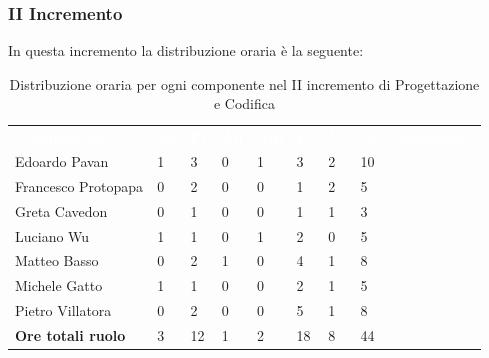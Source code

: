 \subsubsection{II Incremento}
In questa incremento la distribuzione oraria è la seguente:
\begin{table}[H]
\begin{center}
\renewcommand{\arraystretch}{1.25}
\begin{tabular}{ m{}<{\centering}  m{}<{\centering} m{}<{\centering} m{}<{\centering}  m{}<{\centering}  m{}<{\centering}  m{}<{\centering}  m{}<{\centering}   }
	\rowcolor{darkblue}
	\textcolor{white}{\textbf{Componente}} &\textcolor{white}{\textbf{Re}}&\textcolor{white}{\textbf{Pt}}&\textcolor{white}{\textbf{An}}&\textcolor{white}{\textbf{Am}}&\textcolor{white}{\textbf{Pr}}&\textcolor{white}{\textbf{Ve}}&\textcolor{white}{\textbf{Ore complessive}}\\ 
	Edoardo Pavan & 1 & 3 & 0 & 1 & 3 & 2 & 10 \\	
	
	Francesco Protopapa & 0 & 2 & 0 & 0 & 1 & 2 & 5 \\

	Greta Cavedon & 0 & 1 & 0 & 0 & 1 & 1 & 3 \\
	
	Luciano Wu & 1 & 1 & 0 & 1 & 2 & 0 & 5 \\
	
	Matteo Basso & 0 & 2 & 1 & 0 & 4 & 1 & 8 \\
	
	Michele Gatto & 1 & 1 & 0 & 0 & 2 & 1 & 5 \\
	
	Pietro Villatora & 0 & 2 & 0 & 0 & 5 & 1 & 8 \\
	
	\textbf{Ore totali ruolo} & 3 & 12 & 1 & 2 & 18 & 8 & 44 \\

\end{tabular}
\caption{Distribuzione oraria per ogni componente nel II incremento di Progettazione e Codifica}
\end{center}
\end{table}

